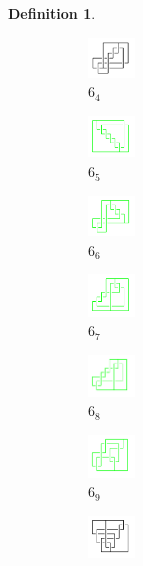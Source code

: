 \documentclass{article}
\theoremstyle{definition}
\newtheorem{defn}[thm]{Definition}
\theoremstyle{theorem}
\theoremstyle{proposition}
\theoremstyle{corollary}
\begin{document}
\begin{defn}
\begin{figure}[H]
\begin{subfigure}{0.075\textwidth}
    \includegraphics[width=1.25cm]{../Midterm_Poster/grid_diagram/handcuff_6_4.png}
    \caption{$6_{4}$} 
    \end{subfigure}
    \begin{subfigure}{0.075\textwidth}
    \includegraphics[width=1.25cm]{../Midterm_Poster/grid_diagram/handcuff_6_5.png}
    \caption{$6_{5}$} 
    \end{subfigure}
    \begin{subfigure}{0.075\textwidth}
    \includegraphics[width=1.25cm]{../Midterm_Poster/grid_diagram/handcuff_6_6.png}
    \caption{$6_{6}$} 
    \end{subfigure}
    \begin{subfigure}{0.075\textwidth}
    \includegraphics[width=1.25cm]{../Midterm_Poster/grid_diagram/handcuff_6_7.png}
    \caption{$6_{7}$} 
    \end{subfigure}
    \begin{subfigure}{0.075\textwidth}
    \includegraphics[width=1.25cm]{../Midterm_Poster/grid_diagram/handcuff_6_8.png}
    \caption{$6_{8}$} 
    \end{subfigure}
    \begin{subfigure}{0.075\textwidth}
    \includegraphics[width=1.25cm]{../Midterm_Poster/grid_diagram/handcuff_6_9.png}
    \caption{$6_{9}$} 
    \end{subfigure}
    \begin{subfigure}{0.075\textwidth}
    \includegraphics[width=1.25cm]{../Midterm_Poster/grid_diagram/handcuff_7_1.png}

\end{subfigure}
\end{figure}
\end{defn}
\end{document}
